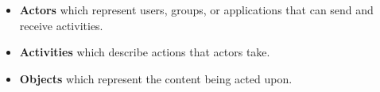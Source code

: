 \begin{itemize}
  \item \textbf{Actors} which represent users, groups, or applications that can send and receive activities.
  \item \textbf{Activities} which describe actions that actors take.
  \item \textbf{Objects} which represent the content being acted upon.
\end{itemize}
